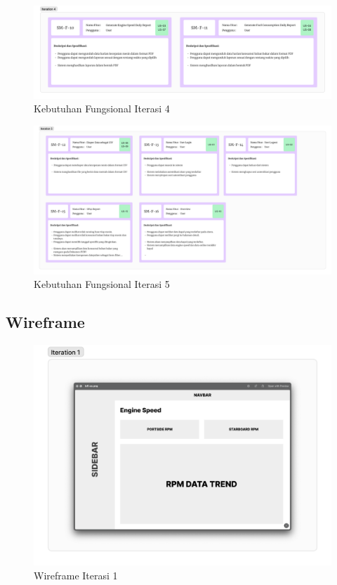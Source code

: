 \begin{landscape}
    \begin{figure}[!h]
        \includegraphics[width=1\linewidth, center]{images/lampiran/fr/fr-it4.png}
        \caption{Kebutuhan Fungsional Iterasi 4}
        \label{fig:fr-it4}
    \end{figure}

    \begin{figure}[!h]
        \includegraphics[width=1\linewidth, center]{images/lampiran/fr/fr-it5.png}
        \caption{Kebutuhan Fungsional Iterasi 5}
        \label{fig:fr-it5}
    \end{figure}

    \newpage
    \subsection{Wireframe}

    \begin{figure}[!h]
        \includegraphics[width=.7\linewidth, center]{images/lampiran/wireframe/wire-it1.png}
        \caption{Wireframe Iterasi 1}
        \label{fig:wire-it1}
    \end{figure}


\end{landscape}
